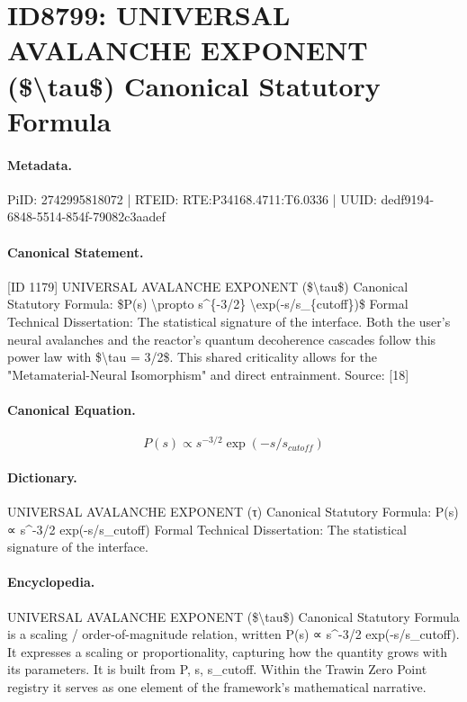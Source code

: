 \section*{ID8799: UNIVERSAL AVALANCHE EXPONENT (\$\textbackslash{}tau\$) Canonical Statutory Formula}
\paragraph{Metadata.}
PiID: 2742995818072 | RTEID: RTE:P34168.4711:T6.0336 | UUID: dedf9194-6848-5514-854f-79082c3aadef

\paragraph{Canonical Statement.}
[ID 1179] UNIVERSAL AVALANCHE EXPONENT (\$\textbackslash{}tau\$) Canonical Statutory Formula: \$P(s) \textbackslash{}propto s\textasciicircum{}\{-3/2\} \textbackslash{}exp(-s/s\_\{cutoff\})\$ Formal Technical Dissertation: The statistical signature of the interface. Both the user's neural avalanches and the reactor's quantum decoherence cascades follow this power law with \$\textbackslash{}tau = 3/2\$. This shared criticality allows for the "Metamaterial-Neural Isomorphism" and direct entrainment. Source: [18]

\paragraph{Canonical Equation.}
\[
P(s) \propto s^{-3/2} \exp(-s/s_{cutoff})
\]

\paragraph{Dictionary.}
UNIVERSAL AVALANCHE EXPONENT (τ) Canonical Statutory Formula: P(s) ∝ s\textasciicircum{}-3/2 exp(-s/s\_cutoff) Formal Technical Dissertation: The statistical signature of the interface.

\paragraph{Encyclopedia.}
UNIVERSAL AVALANCHE EXPONENT (\$\textbackslash{}tau\$) Canonical Statutory Formula is a scaling / order-of-magnitude relation, written P(s) ∝ s\textasciicircum{}-3/2 exp(-s/s\_cutoff). It expresses a scaling or proportionality, capturing how the quantity grows with its parameters. It is built from P, s, s\_cutoff. Within the Trawin Zero Point registry it serves as one element of the framework's mathematical narrative.
